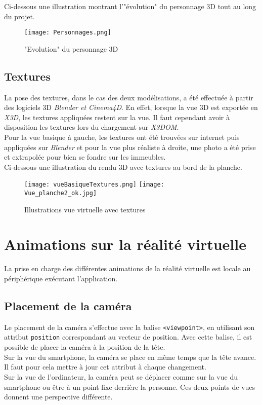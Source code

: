 Ci-dessous une illustration montrant l'"évolution" du personnage 3D tout au long du projet.
\begin{figure}[H]
	\centering
   \texttt{[image: Personnages.png]}
   \caption{\label{Evopersonnages} "Evolution" du personnage 3D}
\end{figure}


\subsection{Textures}  \label{textures}
La pose des textures, dans le cas des deux modélisations, a été effectuée à partir des logiciels 3D \textit{Blender et Cinema4D}. En effet, lorsque la vue 3D est exportée en \textit{X3D}, les textures appliquées restent sur la vue. Il faut cependant avoir à disposition les textures lors du chargement sur \textit{X3DOM}. \\

Pour la vue basique à gauche, les textures ont été trouvées sur internet puis appliquées sur \textit{Blender} et pour la vue plus réaliste à droite, une photo a été prise et extrapolée pour bien se fondre sur les immeubles.\\

Ci-dessous une illustration du rendu 3D avec textures au bord de la planche.
\begin{figure}[H]
   \texttt{[image: vueBasiqueTextures.png]}
   \texttt{[image: Vue\_planche2\_ok.jpg]}
   \caption{\label{textures} Illustrations vue virtuelle avec textures}
\end{figure}

\pagebreak
\section{Animations sur la réalité virtuelle} \label{animation}
La prise en charge des différentes animations de la réalité virtuelle est locale au périphérique exécutant l'application.

\subsection*{Placement de la caméra}  \label{camera}
Le placement de la caméra s'effectue avec la balise \texttt{<viewpoint>}, en utilisant son attribut \texttt{position} correspondant au vecteur de position. Avec cette balise, il est possible de placer la caméra à la position de la tête.\\
Sur la vue du \textsf{smartphone}, la caméra se place en même temps que la tête avance. Il faut pour cela mettre à jour cet attribut à chaque changement.\\
Sur la vue de l'ordinateur, la caméra peut se déplacer comme sur la vue du \textsf{smartphone} ou être à un point fixe derrière la personne. Ces deux points de vues donnent une perspective différente.\\

